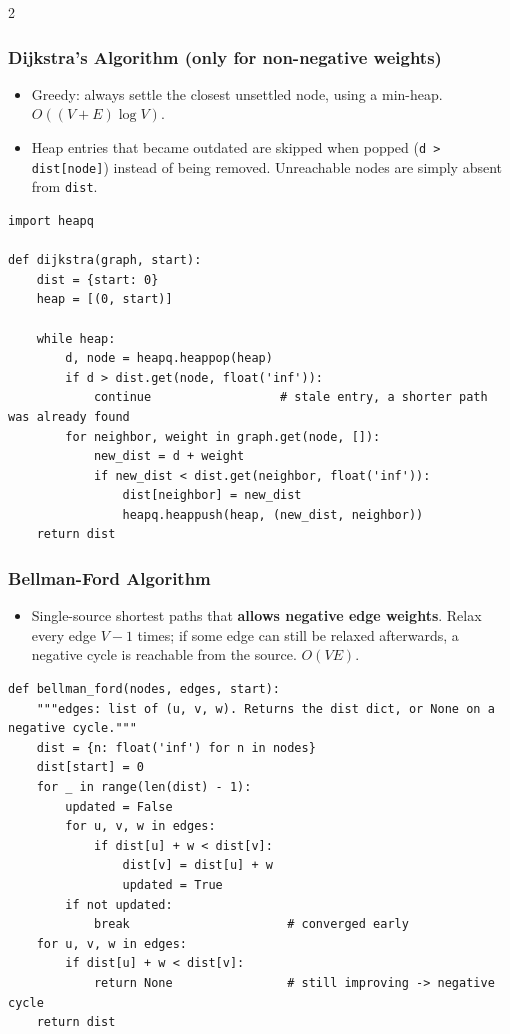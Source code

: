 \documentclass[9pt,a4paper]{extarticle}
\begin{document}
\begin{multicols}{2}
\subsubsection{Dijkstra's Algorithm (only for non-negative weights)}

\begin{itemize}
\item Greedy: always settle the closest unsettled node, using a min-heap. $O((V+E) \log V)$.
\item Heap entries that became outdated are skipped when popped (\texttt{d > dist[\allowbreak{}node]}) instead of being removed. Unreachable nodes are simply absent from \texttt{dist}.
\end{itemize}

\begin{lstlisting}
import heapq

def dijkstra(graph, start):
    dist = {start: 0}
    heap = [(0, start)]

    while heap:
        d, node = heapq.heappop(heap)
        if d > dist.get(node, float('inf')):
            continue                  # stale entry, a shorter path was already found
        for neighbor, weight in graph.get(node, []):
            new_dist = d + weight
            if new_dist < dist.get(neighbor, float('inf')):
                dist[neighbor] = new_dist
                heapq.heappush(heap, (new_dist, neighbor))
    return dist
\end{lstlisting}

\subsubsection{Bellman-Ford Algorithm}

\begin{itemize}
\item Single-source shortest paths that \textbf{allows negative edge weights}. Relax every edge $V-1$ times; if some edge can still be relaxed afterwards, a negative cycle is reachable from the source. $O(VE)$.
\end{itemize}

\begin{lstlisting}
def bellman_ford(nodes, edges, start):
    """edges: list of (u, v, w). Returns the dist dict, or None on a negative cycle."""
    dist = {n: float('inf') for n in nodes}
    dist[start] = 0
    for _ in range(len(dist) - 1):
        updated = False
        for u, v, w in edges:
            if dist[u] + w < dist[v]:
                dist[v] = dist[u] + w
                updated = True
        if not updated:
            break                      # converged early
    for u, v, w in edges:
        if dist[u] + w < dist[v]:
            return None                # still improving -> negative cycle
    return dist
\end{lstlisting}


\end{multicols}
\end{document}
